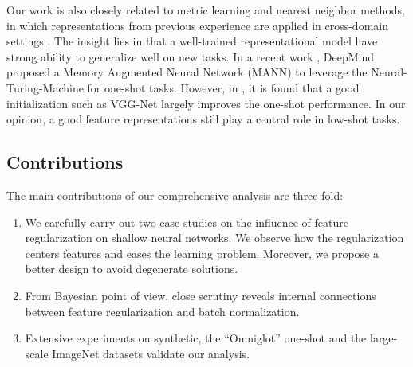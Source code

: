 Our work is also closely related to metric learning and nearest neighbor methods, in which representations from previous experience are applied in cross-domain settings \cite{metric-feature-transfer,one-shot-siamese,nca,one-shot-face}. The insight lies in that a well-trained representational model have strong ability to generalize well on new tasks. In a recent work \cite{mann}, DeepMind proposed a Memory Augmented Neural Network (MANN) to leverage the Neural-Turing-Machine for one-shot tasks. However, in \cite{matching-network}, it is found that a good initialization such as VGG-Net largely improves the one-shot performance. In our opinion, a good feature representations still play a central role in low-shot tasks. 


\subsection{Contributions}
The main contributions of our comprehensive analysis are three-fold:
\begin{enumerate}
\item We carefully carry out two case studies on the influence of feature regularization on shallow neural networks. We observe how the regularization centers features and eases the learning problem. Moreover, we propose a better design to avoid degenerate solutions.
\item From Bayesian point of view, close scrutiny reveals internal connections between feature regularization and batch normalization.
\item Extensive experiments on synthetic, the ``Omniglot'' one-shot and the large-scale ImageNet datasets validate our analysis.
\end{enumerate}

